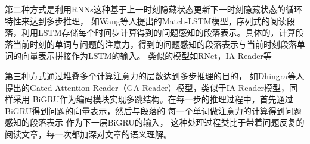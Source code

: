 \noindent
第二种方式是利用RNNs这种基于上一时刻隐藏状态更新下一时刻隐藏状态的循环特性来达到多步推理，
如Wang等人提出的Match-LSTM模型，序列式的阅读段落，利用LSTM存储每个时间步计算得到的问题感知的段落表示。具体的，计算段落当前时刻的单词与问题的注意力，得到的问题感知的段落表示与当前时刻段落单词的向量表示拼接作为LSTM的输入。
类似的模型如RNet，IA Reader等
\vspace{1ex}
%

\noindent
第三种方式通过堆叠多个计算注意力的层数达到多步推理的目的，
如Dhingra等人提出的Gated Attention Reader（GA Reader）模型，类似于IA Reader模型，同样采用
BiGRU作为编码模块实现多跳结构。在每一步的推理过程中，首先通过BiGRU得到问题的向量表示，然后与段落的
每一个单词做注意力的计算得到问题感知的段落表示
作为下一层BiGRU的输入，
这种处理过程类比于带着问题反复的阅读文章，每一次都加深对文章的语义理解。

